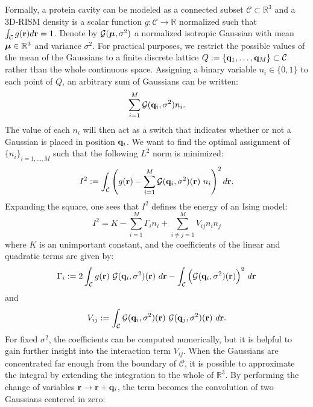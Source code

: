 \documentclass[fleqn,10pt]{wlscirep}
\begin{document}
Formally, a protein cavity can be modeled as a connected subset $\mathcal{C} \subset \mathbb{R}^3$ and a 3D-RISM density is a scalar function $g: \mathcal{C} \rightarrow \mathbb{R}$ normalized such that $\int_\mathcal{C} g(\vb{r}) d\vb{r} = 1$. Denote by $\mathcal{G}(\vb*{\mu}, \sigma^2)$ a normalized isotropic Gaussian with mean $\vb*{\mu} \in \mathbb{R}^3$ and variance $\sigma^2$. For practical purposes, we restrict the possible values of the mean of the Gaussians to a finite discrete lattice $Q := \{\vb{q}_1, \ldots, \vb{q}_M\} \subset \mathcal{C}$ rather than the whole continuous space. Assigning a binary variable $n_i \in \{0,1\}$ to each point of $Q$, an arbitrary sum of Gaussians can be written:
\begin{equation}\label{eq:anysog}
    \sum_{i=1}^M \mathcal{G}(\vb{q}_i, \sigma^2) n_i.
\end{equation}
The value of each $n_i$ will then act as a switch that indicates whether or not a Gaussian is placed in position $\vb{q}_i$. We want to find the optimal assignment of $\{n_i\}_{i=1,\ldots,M}$ such that the following $L^2$ norm is minimized:
\begin{equation}\label{eq:l2distance}
    I^2 := \int_\mathcal{C} \left( g(\vb{r}) - \sum_{i=1}^M \mathcal{G}(\vb{q}_i, \sigma^2)(\vb{r}) \ n_i  \right)^2 d\vb{r}.
\end{equation}
Expanding the square, one sees that $I^2$ defines the energy of an Ising model:
\begin{equation}\label{eq:ising_classical}
    I^2 = K - \sum_{i=1}^M \Gamma_i n_i + \sum_{i\neq j=1}^M V_{ij} n_i n_j
\end{equation}
where $K$ is an unimportant constant, and the coefficients of the linear and quadratic terms are given by:
\begin{equation}\label{eq:gamma-local}
    \Gamma_i := 2\int_\mathcal{C} g(\vb{r}) \ \mathcal{G}(\vb{q}_i,\sigma^2)(\vb{r}) \ d\vb{r} - \int_\mathcal{C} \Big( \mathcal{G}(\vb{q}_i,\sigma^2)(\vb{r})\Big)^2 \ d\vb{r}
\end{equation}
and
\begin{equation}
    V_{ij} := \int_\mathcal{C} \mathcal{G}(\vb{q}_i,\sigma^2)(\vb{r}) \  \mathcal{G}(\vb{q}_j,\sigma^2)(\vb{r}) \ d\vb{r}.
\end{equation}
For fixed $\sigma^2$, the coefficients can be computed numerically, but it is helpful to gain further insight into the interaction term $V_{ij}$. When the Gaussians are concentrated far enough from the boundary of $\mathcal{C}$, it is possible to approximate the integral by extending the integration to the whole of $\mathbb{R}^3$. By performing the change of variables $\vb{r} \rightarrow \vb{r}+\vb{q}_i$, the term becomes the convolution of two Gaussians centered in zero:
\end{document}

